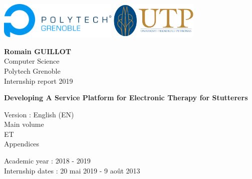 \begin{titlepage}
    \begin{center}

      \includegraphics[height=1.75cm]{polytech_logo.png}%
      \hfill%
      \hfill%
      \includegraphics[height=1.75cm]{utp_logo.png}%

        \vspace{3cm}

        \large
        \textbf{Romain GUILLOT} \\
        Computer Science \\
        Polytech Grenoble \\
        Internship report 2019

        \vspace{2.5cm}

        \huge
        \textbf{Developing A Service Platform for Electronic Therapy for Stutterers}

        \vspace{0.5cm}
        \large Version : English (EN)\\
        \vspace{2.5cm}
        \large Main volume \\
        \small ET \\
        \large Appendices


        \vfill

        \large
        Academic year : 2018 - 2019\\
        Internship dates : 20 mai 2019 - 9 août 2013

    \end{center}
\end{titlepage}
